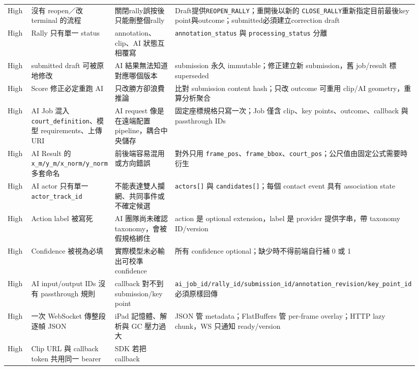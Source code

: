 \documentclass[
  9pt,
  a4paper,
]{article}
\begin{document}
\begin{longtable}[]{@{}>{\RaggedRight\arraybackslash}p{0.11\linewidth}>{\RaggedRight\arraybackslash}p{0.19\linewidth}>{\RaggedRight\arraybackslash}p{0.31\linewidth}>{\RaggedRight\arraybackslash}p{0.33\linewidth}@{}}
High & 沒有 reopen／改 terminal 的流程 & 關閉rally誤按後只能刪整個rally &
Draft提供\texttt{REOPEN\_\allowbreak{}RALLY}；重開後以新的
\texttt{CLOSE\_\allowbreak{}RALLY}重新指定目前最後key point與outcome；submitted必須建立correction draft \\
High & Rally 只有單一 status & annotation、clip、AI 狀態互相覆寫 &
\texttt{annotation\_\allowbreak{}status} 與 \texttt{processing\_\allowbreak{}status} 分離 \\
High & submitted draft 可被原地修改 & AI 結果無法知道對應哪個版本 &
submission 永久 immutable；修正建立新 submission，舊 job/result 標
superseded \\
High & Score 修正必定重跑 AI & 只改勝方卻浪費推論 & 比對 submission
content hash；只改 outcome 可重用 clip/AI geometry，重算分析聚合 \\
High & AI Job 混入 \texttt{court\_\allowbreak{}definition}、模型 requirements、上傳
URI & AI request 像是在遠端配置 pipeline，耦合中央儲存 &
固定座標規格只寫一次；Job 僅含 clip、key points、outcome、callback 與
passthrough IDs \\
High & AI Result 的 \texttt{x\_\allowbreak{}m/y\_\allowbreak{}m/x\_\allowbreak{}norm/y\_\allowbreak{}norm} 多套命名 &
前後端容易混用或方向錯誤 & 對外只用
\texttt{frame\_\allowbreak{}pos}、\texttt{frame\_\allowbreak{}bbox}、\texttt{court\_\allowbreak{}pos}；公尺值由固定公式需要時衍生 \\
High & AI actor 只有單一 \texttt{actor\_\allowbreak{}track\_\allowbreak{}id} &
不能表達雙人攔網、共同事件或不確定候選 & \texttt{actors{[}{]}} 與
\texttt{candidates{[}{]}}；每個 contact event 具有 association state \\
High & Action label 被寫死 & AI 團隊尚未確認 taxonomy，會被假規格綁住 &
action 是 optional extension，label 是 provider 提供字串，帶 taxonomy
ID/version \\
High & Confidence 被視為必填 & 實際模型未必輸出可校準 confidence & 所有
confidence optional；缺少時不得前端自行補 0 或 1 \\
High & AI input/output IDs 沒有 passthrough 規則 & callback 對不到
submission/key point &
\texttt{ai\_\allowbreak{}job\_\allowbreak{}id/rally\_\allowbreak{}id/submission\_\allowbreak{}id/annotation\_\allowbreak{}revision/key\_\allowbreak{}point\_\allowbreak{}id}
必須原樣回傳 \\
High & 一次 WebSocket 傳整段逐幀 JSON & iPad 記憶體、解析與 GC 壓力過大
& JSON 管 metadata；FlatBuffers 管 per-frame overlay；HTTP lazy
chunk，WS 只通知 ready/version \\
High & Clip URL 與 callback token 共用同一 bearer & SDK 若把 callback

\end{longtable}
\end{document}
